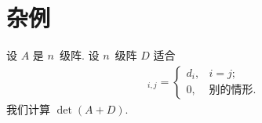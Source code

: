 \documentclass[../libro.tex]{subfiles}
\begin{document}

\section{杂例}

\begin{example}
    设 \(A\) 是 \(n\)~级阵.
    设 \(n\)~级阵 \(D\) 适合
    \begin{align*}
        [D]_{i,j} =
        \begin{cases}
            d_i, & i = j;       \\
            0,   & \text{别的情形}.
        \end{cases}
    \end{align*}
    我们计算 \(\det {(A + D)}\).


\end{example}
\end{document}
